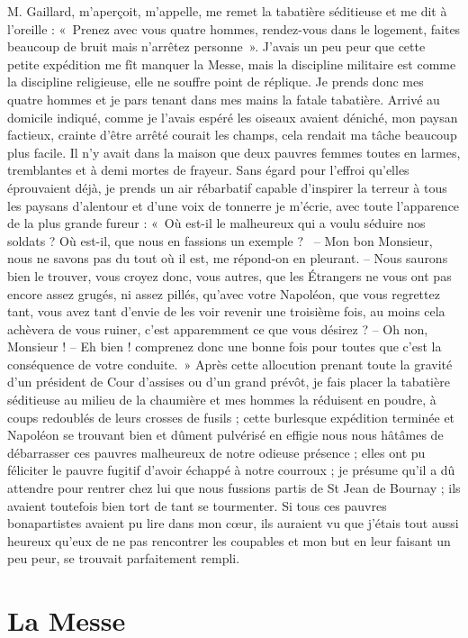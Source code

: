 \documentclass[11pt,a4paper]{report}
\begin{document}
M. Gaillard, m'aperçoit, m'appelle, me remet la tabatière séditieuse et me dit à l'oreille : «~Prenez avec vous quatre hommes, rendez-vous dans le logement, faites beaucoup de bruit mais n'arrêtez personne~». J'avais un peu peur que cette petite expédition me fît manquer la Messe, mais la discipline militaire est comme la discipline religieuse, elle ne souffre point de réplique. Je prends donc mes quatre hommes et je pars tenant dans mes mains la fatale tabatière. Arrivé au domicile indiqué, comme je l'avais espéré les oiseaux avaient déniché, mon paysan factieux, crainte d'être arrêté courait les champs, cela rendait ma tâche beaucoup plus facile. Il n'y avait dans la maison que deux pauvres femmes toutes en larmes, tremblantes et à demi mortes de frayeur. Sans égard pour l'effroi qu'elles éprouvaient déjà, je prends un air rébarbatif capable d'inspirer la terreur à tous les paysans d'alentour et d'une voix de tonnerre je m'écrie, avec toute l'apparence de la plus grande fureur : «~Où est-il le malheureux qui a voulu séduire nos soldats ? Où est-il, que nous en fassions un exemple ?~ -- Mon bon Monsieur, nous ne savons pas du tout où il est, me répond-on en pleurant. -- Nous saurons bien le trouver, vous croyez donc, vous autres, que les Étrangers ne vous ont pas encore assez grugés, ni assez pillés, qu'avec votre Napoléon, que vous regrettez tant, vous avez tant d'envie de les voir revenir une troisième fois, au moins cela achèvera de vous ruiner, c'est apparemment ce que vous désirez ? -- Oh non, Monsieur ! -- Eh bien ! comprenez donc une bonne fois pour toutes que c'est la conséquence de votre conduite.~» Après cette allocution prenant toute la gravité d'un président de Cour d'assises ou d'un grand prévôt, je fais placer la tabatière séditieuse au milieu de la chaumière et mes hommes la réduisent en poudre, à coups redoublés de leurs crosses de fusils ; cette burlesque expédition terminée et Napoléon se trouvant bien et dûment pulvérisé en effigie nous nous hâtâmes de débarrasser ces pauvres malheureux de notre odieuse présence ; elles ont pu féliciter le pauvre fugitif d'avoir échappé à notre courroux ; je présume qu'il a dû attendre pour rentrer chez lui que nous fussions partis de St Jean de Bournay ; ils avaient toutefois bien tort de tant se tourmenter. Si tous ces pauvres bonapartistes avaient pu lire dans mon cœur, ils auraient vu que j'étais tout aussi heureux qu'eux de ne pas rencontrer les coupables et mon but en leur faisant un peu peur, se trouvait parfaitement rempli.

\section*{La Messe}
\end{document}

